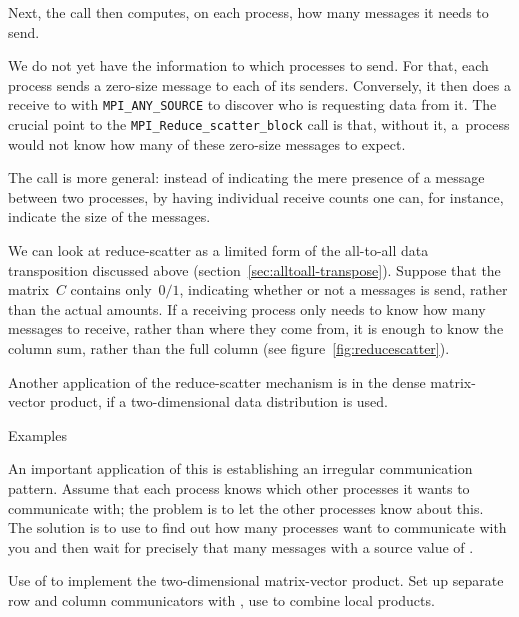 Next, the  call then
computes, on each process, how many messages it needs to send.
%

We do not yet have the information to which processes to send.
For that, each process sends a zero-size message to
each of its senders.
Conversely, it then does a receive to with \lstinline+MPI_ANY_SOURCE+
to discover who is requesting data from it.
The crucial point to the \lstinline+MPI_Reduce_scatter_block+ call
is that, without it, a~process would not know how many
of these zero-size messages to expect.


The  call is more general:
instead of indicating the mere presence of a message
between two processes,
by having individual receive counts one can, for instance,
indicate the size of the messages.

We can look at reduce-scatter as a limited form of the all-to-all data
transposition discussed above (section~\ref{sec:alltoall-transpose}).
Suppose that the matrix~$C$ contains only~$0/1$, indicating
whether or not a messages is send, rather than the actual amounts.
If a receiving process only needs to know how many messages to
receive, rather than where they come from, it is enough to know the
column sum, rather than the full column (see figure~\ref{fig:reducescatter}).

Another application of the reduce-scatter mechanism is in the
dense matrix-vector product, if a two-dimensional data distribution
is used.

 {Examples}

An important application of this is establishing an irregular
communication pattern.  Assume that each process knows which
other processes it wants to communicate with; the problem is to
let the other processes know about this.
The solution is to use  to find out how many processes
want to communicate with you
and then wait for precisely that many messages
with a source value of .

Use of  to implement the two-dimensional
matrix-vector product.
Set up separate row and column communicators with
, use  to combine
local products.
%

